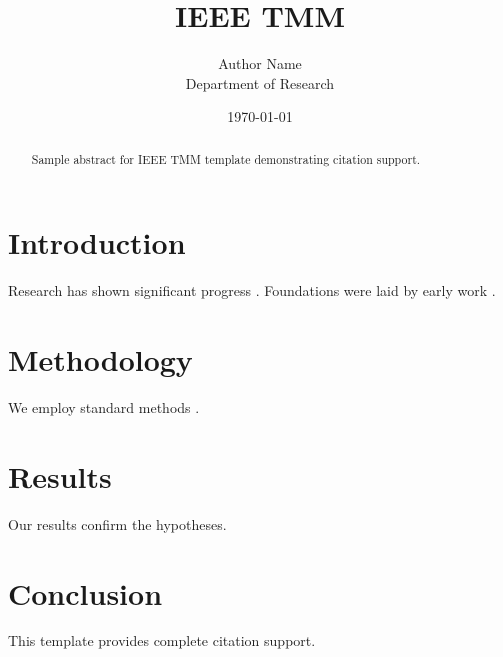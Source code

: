 ﻿\documentclass{IEEEtran}
\title{IEEE TMM}
\author{Author Name \\ \small Department of Research}
\date{\today}
\begin{document}
\maketitle

\begin{abstract}
Sample abstract for IEEE TMM template demonstrating citation support.
\end{abstract}

\section{Introduction}
Research has shown significant progress \citep{einstein1905}. Foundations were laid by early work \citep{turing1950}.

\section{Methodology}
We employ standard methods \citep{knuth1984}.

\section{Results}
Our results confirm the hypotheses.

\section{Conclusion}
This template provides complete citation support.



\end{document}
